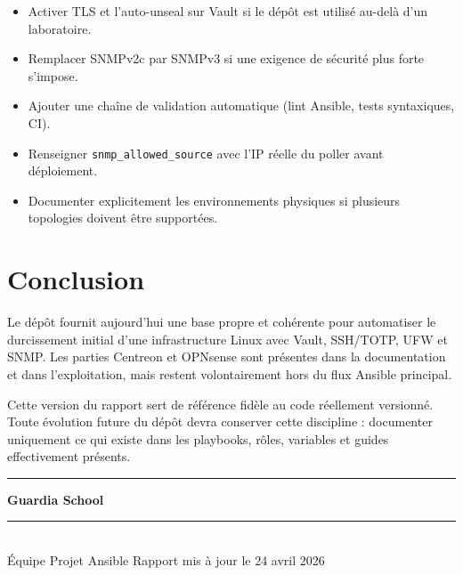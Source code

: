 \documentclass[11pt,a4paper]{article}
\newcommand{\iconArrow}{\textcolor{AccentBlue}{\faArrowRight}}
\begin{document}
\begin{tcolorbox}[
  enhanced,
  colback=white,
  colframe=BorderGray,
  boxrule=0.8pt,
  arc=8pt,
  left=10pt,right=10pt,top=10pt,bottom=10pt,
  title={\iconArrow\hspace{0.4em}\textbf{Actions recommandées}},
  fonttitle=\bfseries\small,
  coltitle=PrimaryBlue,
  attach boxed title to top left={yshift=-2mm,xshift=6mm},
  boxed title style={colback=white,colframe=BorderGray,arc=4pt,boxrule=0.8pt}
]
\begin{itemize}
\RaggedRight
  \item Activer TLS et l'auto-unseal sur Vault si le dépôt est utilisé au-delà d'un laboratoire.
  \item Remplacer SNMPv2c par SNMPv3 si une exigence de sécurité plus forte s'impose.
  \item Ajouter une chaîne de validation automatique (lint Ansible, tests syntaxiques, CI).
  \item Renseigner \texttt{snmp\_allowed\_source} avec l'IP réelle du poller avant déploiement.
  \item Documenter explicitement les environnements physiques si plusieurs topologies doivent être supportées.
\end{itemize}
\end{tcolorbox}

\section{Conclusion}

Le dépôt fournit aujourd'hui une base propre et cohérente pour automatiser le durcissement initial d'une infrastructure Linux avec Vault, SSH/TOTP, UFW et SNMP. Les parties Centreon et OPNsense sont présentes dans la documentation et dans l'exploitation, mais restent volontairement hors du flux Ansible principal.

Cette version du rapport sert de référence fidèle au code réellement versionné. Toute évolution future du dépôt devra conserver cette discipline : documenter uniquement ce qui existe dans les playbooks, rôles, variables et guides effectivement présents.

\vspace{3em}
\begin{center}
  \textcolor{PrimaryBlue}{\rule{4cm}{0.8pt}\hspace{1em}\textbf{\large Guardia School}\hspace{1em}\rule{4cm}{0.8pt}}\\[1em]
  \textcolor{MediumGray}{\small Équipe Projet Ansible \textperiodcentered{} Rapport mis à jour le 24 avril 2026}
\end{center}
\end{document}
